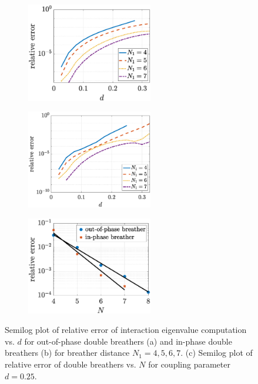 \documentclass[12pt,reqno]{amsart}
\theoremstyle{definition}
\begin{document}
\begin{figure}
	\begin{center}
	\begin{subfigure}{0.3\linewidth}
		\caption{}
		\includegraphics[width=5.5cm]{doubleeigerrord.eps} \hspace{-0.5cm}
		\label{fig:eigerrora} 
	\end{subfigure}
	\begin{subfigure}{0.3\linewidth}
		\caption{}
		\includegraphics[width=5.5cm]{doubleppeigerrord.eps} \hspace{-0.5cm}
		\label{fig:eigerrorb} 
	\end{subfigure}
	\begin{subfigure}{0.3\linewidth}
		\caption{}
		\includegraphics[width=5.5cm]{doubleeigerrorN.eps} 
		\label{fig:eigerrorc} 
	\end{subfigure}
	\end{center}
	\caption{Semilog plot of relative error of interaction eigenvalue computation vs. $d$ for out-of-phase double breathers (a) and in-phase double breathers (b) for breather distance $N_1 = 4,5,6,7$. (c) Semilog plot of relative error of double breathers vs. $N$ for coupling parameter $d = 0.25$.}
	\label{fig:eigerror}
\end{figure}
\end{document}
